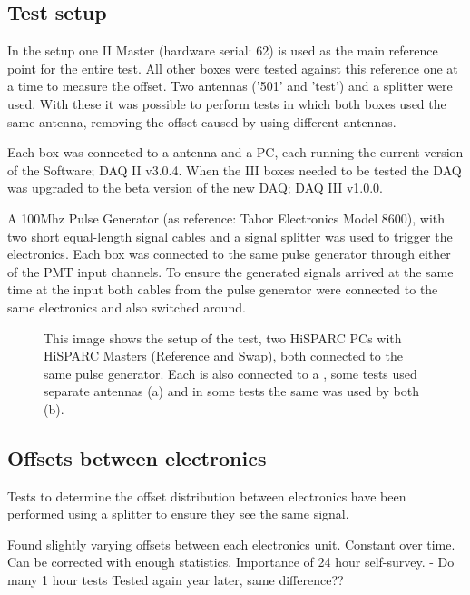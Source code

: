\subsection{Test setup}
\label{sub:gps_test_setup}

In the setup one \hisparc II Master (hardware serial: 62) is used as the
main reference point for the entire test. All other \hisparc boxes were
tested against this reference one at a time to measure the offset. Two
\gps antennas ('501' and 'test') and a \gps splitter were used. With
these it was possible to perform tests in which both \hisparc boxes used
the same \gps antenna, removing the offset caused by using different
\gps antennas.

Each \hisparc box was connected to a \gps antenna and a PC, each running
the current version of the \hisparc Software; \hisparc DAQ II v3.0.4.
When the \hisparc III boxes needed to be tested the DAQ was upgraded to
the beta version of the new DAQ; \hisparc DAQ III v1.0.0.

A 100Mhz Pulse Generator (as reference: Tabor Electronics Model 8600),
with two short equal-length signal cables and a signal splitter was used
to trigger the \hisparc electronics. Each box was connected to the same
pulse generator through either of the PMT input channels. To ensure the
generated signals arrived at the same time at the input both cables from
the pulse generator were connected to the same \hisparc electronics and
also switched around.

\begin{figure}
    \centering
    
    \caption{This image shows the setup of the test, two HiSPARC PCs
             with HiSPARC Masters (Reference and Swap), both connected
             to the same pulse generator. Each is also connected to a
             \gps, some tests used separate \gps antennas (a) and in
             some tests the same \gps was used by both (b).}
    \label{fig:setup}
\end{figure}


\subsection{Offsets between \hisparc electronics}
\label{sub:gps_offsets}

Tests to determine the offset distribution between \hisparc electronics
have been performed using a \gps splitter to ensure they see the same
\gps signal.

Found slightly varying offsets between each \hisparc electronics unit.
Constant over time. Can be corrected with enough statistics.
Importance of 24 hour self-survey. - Do many 1 hour tests
Tested again year later, same difference??

